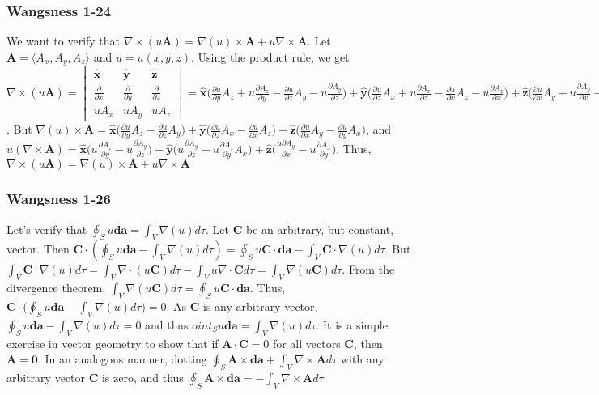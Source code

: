 \documentclass[oneside]{book}
\theoremstyle{definition}
\newcommand*\B[1]{\mathbf{#1}}
\newcommand*\Bh[1]{\mathbf{\hat{#1}}}
\begin{document}
\subsubsection{Wangsness 1-24}
We want to verify that $\nabla \times (u\B{A}) = \nabla(u)\times \B{A}+u\nabla \times \B{A}$. Let $\B{A} = \langle A_x,A_y,A_z\rangle$ and $u = u(x,y,z)$. Using the product rule, we get $\nabla \times (u\B{A}) = \begin{vmatrix} \Bh{x} & \Bh{y} & \Bh{z} \\ \frac{\partial}{\partial x} & \frac{\partial}{\partial y} & \frac{\partial}{\partial z} \\ uA_x & uA_y & uA_z \end{vmatrix} =\Bh{x}\big( \frac{\partial u}{\partial y} A_z + u \frac{\partial A_z}{\partial y}-\frac{\partial u}{\partial z}A_y -u \frac{\partial A_y}{\partial z}\big) + \Bh{y}\big(\frac{\partial u}{\partial z} A_x + u \frac{\partial A_x}{\partial z} - \frac{\partial u}{\partial x} A_z - u\frac{\partial A_z}{\partial x}\big) + \Bh{z}\big(\frac{\partial u}{\partial x}A_y + u \frac{\partial A_y}{\partial x} - \frac{\partial u}{\partial y}A_x - u\frac{\partial A_x}{\partial y}\big)$. But $\nabla(u)\times \B{A} = \Bh{x}\big(\frac{\partial u}{\partial y}A_z - \frac{\partial u}{\partial z}A_y\big) + \Bh{y}\big(\frac{\partial u}{\partial z}A_x - \frac{\partial u}{\partial x}A_z\big) + \Bh{z}\big(\frac{\partial u}{\partial x}A_y - \frac{\partial u}{\partial y}A_x\big)$, and $u(\nabla \times \B{A}) = \Bh{x}\big(u\frac{\partial A_z}{\partial y} - u\frac{\partial A_y}{\partial z}\big) + \Bh{y}\big(u\frac{\partial A_y}{\partial z} -u\frac{\partial A_z}{\partial y}A_x\big) + \Bh{z}\big(\frac{u\partial A_y}{\partial x}-u\frac{\partial A_x}{\partial y}\big)$. Thus, $\nabla \times (u\B{A}) =\nabla(u)\times \B{A}+u\nabla \times \B{A} $

\subsubsection{Wangsness 1-26}
Let's verify that $\oint_{S} u\B{da}= \int_{V} \nabla(u)d\tau$. Let $\B{C}$ be an arbitrary, but constant, vector. Then $\B{C}\cdot(\oint_{S}u\B{da} - \int_V \nabla(u)d\tau) = \oint_{S} u \B{C}\cdot \B{da} - \int_{V} \B{C}\cdot \nabla(u) d\tau$. But $\int_{V} \B{C}\cdot \nabla(u) d\tau = \int_{V} \nabla \cdot (u \B{C}) d\tau - \int_{V} u \nabla \cdot \B{C} d\tau = \int_{V} \nabla(u\B{C}) d\tau$. From the divergence theorem, $\int_{V}\nabla(u\B{C}) d\tau = \oint_{S}u\B{C}\cdot \B{da}$. Thus, $\B{C}\cdot\big(\oint_{S}u \B{da} - \int_{V} \nabla(u) d\tau \big) = 0$. As $\B{C}$ is any arbitrary vector, $\oint_{S}u \B{da} - \int_{V} \nabla(u) d\tau =0$ and thus $oint_{S} u\B{da}= \int_{V} \nabla(u)d\tau$. It is a simple exercise in vector geometry to show that if $\B{A}\cdot \B{C} = 0$ for all vectors $\B{C}$, then $\B{A} = \B{0}$. In an analogous manner, dotting $\oint_{S} \B{A}\times \B{da} + \int_{V} \nabla \times \B{A} d\tau$ with any arbitrary vector $\B{C}$ is zero, and thus $\oint_{S} \B{A}\times \B{da} = - \int_{V} \nabla \times \B{A} d\tau$
\end{document}
